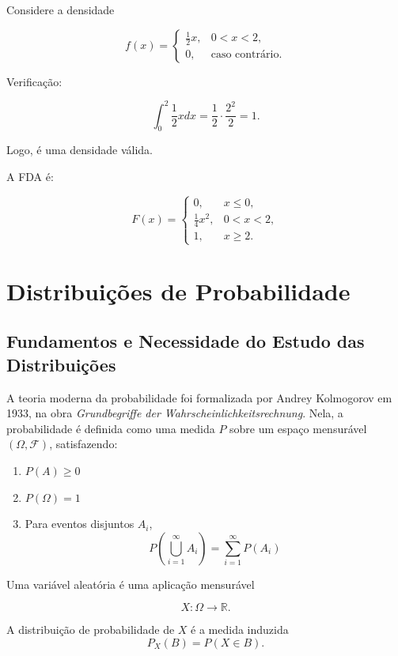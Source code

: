 Considere a densidade

\[
f(x)=
\begin{cases}
\frac{1}{2}x, & 0<x<2,\\
0, & \text{caso contrário}.
\end{cases}
\]

Verificação:

\[
\int_0^2 \frac{1}{2}x dx
=
\frac{1}{2}\cdot\frac{2^2}{2}
=1.
\]

Logo, é uma densidade válida.

A FDA é:

\[
F(x)=
\begin{cases}
0, & x\le 0,\\
\frac{1}{4}x^2, & 0<x<2,\\
1, & x\ge 2.
\end{cases}
\]



\newpage


\section{Distribuições de Probabilidade}
\subsection*{Fundamentos e Necessidade do Estudo das Distribuições}

A teoria moderna da probabilidade foi formalizada por Andrey Kolmogorov em 1933, na obra \textit{Grundbegriffe der Wahrscheinlichkeitsrechnung}. Nela, a probabilidade é definida como uma medida $P$ sobre um espaço mensurável $(\Omega,\mathcal{F})$, satisfazendo:

\begin{enumerate}
\item $P(A)\ge 0$
\item $P(\Omega)=1$
\item Para eventos disjuntos $A_i$,
\[
P\left(\bigcup_{i=1}^\infty A_i\right)=\sum_{i=1}^\infty P(A_i)
\]
\end{enumerate}


Uma variável aleatória é uma aplicação mensurável

\[
X:\Omega\to\mathbb{R}.
\]


A distribuição de probabilidade de $X$ é a medida induzida
\[
P_X(B)=P(X\in B).
\]


